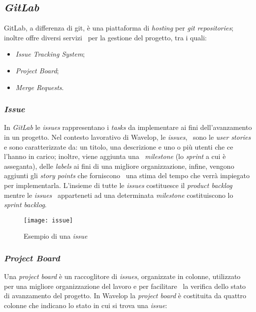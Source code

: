 \subsection{\emph{GitLab}}
GitLab, a differenza di git, è una piattaforma di \emph{hosting} per \emph{git repositories}; inoltre offre diversi servizi \
per la gestione del progetto, tra i quali:

\begin{itemize}
  \item \emph{Issue Tracking System};
  \item \emph{Project Board};
  \item \emph{Merge Requests}.
\end{itemize}

\subsubsection{\emph{Issue}}
In \emph{GitLab} le \emph{issues} rappresentano i \emph{tasks} da implementare ai fini dell'avanzamento in un progetto. Nel contesto lavorativo di Wavelop, le \emph{issues}, \
sono le \emph{user stories} e sono caratterizzate da: un titolo, una descrizione e uno o più utenti che ce l'hanno in carico; inoltre, viene aggiunta una \
\emph{milestone} (lo \emph{sprint} a cui è asseganta), delle \emph{labels} ai fini di una migliore organizzazione, infine, vengono aggiunti gli \emph{story points} che forniscono \
una stima del tempo che verrà impiegato per implementarla. L'insieme di tutte le \emph{issues} costituesce il \emph{product backlog} mentre le \emph{issues} \
apparteneti ad una determinata \emph{milestone} costituiscono lo \emph{sprint backlog}.
\begin{figure}[!ht]
  \begin{center}
    \texttt{[image: issue]}
    \caption{Esempio di una \emph{issue}}
  \end{center}
\end{figure}

\subsubsection{\emph{Project Board}}
Una \emph{project board} è un raccoglitore di \emph{issues}, organizzate in colonne, utilizzato per una migliore organizzazione del lavoro e per facilitare \
la verifica dello stato di avanzamento del progetto. In Wavelop la \emph{project board} è costituita da quattro colonne che indicano lo stato in cui si trova una \emph{issue}:

